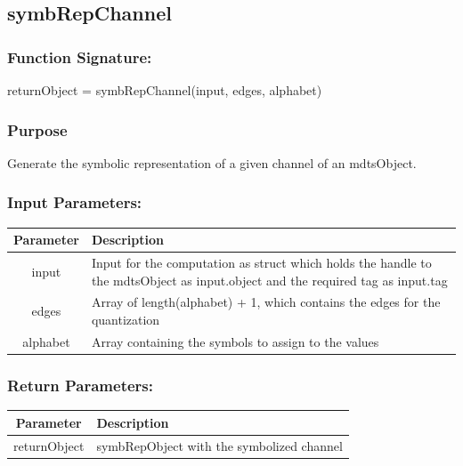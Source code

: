 \documentclass[a4]{scrreprt}
\begin{document}
\subsection{symbRepChannel}

\subsubsection{Function Signature:}

\begin{center}
	returnObject = symbRepChannel(input, edges, alphabet)
\end{center}

\subsubsection{Purpose}

Generate the symbolic representation of a given channel of an mdtsObject.

\subsubsection{Input Parameters:}

\begin{longtabu} to \textwidth {|c|X|}
	\hline
	\textbf{Parameter} & \textbf{Description} \\ \hline
	\endhead
	input & Input for the computation as struct which holds the handle to the mdtsObject as input.object and the required tag as input.tag \\ \hline
	edges & Array of length(alphabet) + 1, which contains the edges for the quantization \\ \hline
	alphabet & Array containing the symbols to assign to the values \\ \hline
\end{longtabu}

\subsubsection{Return Parameters:}

\begin{longtabu} to \textwidth {|c|X|}
	\hline
	\textbf{Parameter} & \textbf{Description} \\ \hline
	\endhead
	returnObject  &  symbRepObject with the symbolized channel \\ \hline
\end{longtabu}
\end{document}
